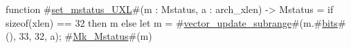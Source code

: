 function #\hyperref[sailRISCVzsetzymstatuszyUXL]{set\_mstatus\_UXL}#(m : Mstatus, a : arch_xlen) -> Mstatus = {
  if   sizeof(xlen) == 32
  then m
  else {
    let m = #\hyperref[sailRISCVzvectorzyupdatezysubrange]{vector\_update\_subrange}#(m.#\hyperref[sailRISCVzbits]{bits}#(), 33, 32,  a);
    #\hyperref[sailRISCVzMkzyMstatus]{Mk\_Mstatus}#(m)
  }
}

